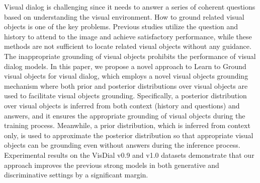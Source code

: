 Visual dialog is challenging since it needs to answer a series of coherent questions based on understanding the visual environment. How to ground related visual objects is one of the key problems. Previous studies utilize the question and history to attend to the image and achieve satisfactory performance, while these methods are not sufficient to locate related visual objects without any guidance. The inappropriate grounding of visual objects prohibits the performance of visual dialog models. In this paper, we propose a novel approach to Learn to Ground visual objects for visual dialog, which employs a novel visual objects grounding mechanism where both prior and posterior distributions over visual objects are used to facilitate visual objects grounding. Specifically, a posterior distribution over visual objects is inferred from both context (history and questions) and answers, and it ensures the appropriate grounding of visual objects during the training process. Meanwhile, a prior distribution, which is inferred from context only, is used to approximate the posterior distribution so that appropriate visual objects can be grounding even without answers during the inference process. Experimental results on the VisDial v0.9 and v1.0 datasets demonstrate that our approach improves the previous strong models in both generative and discriminative settings by a significant margin.

